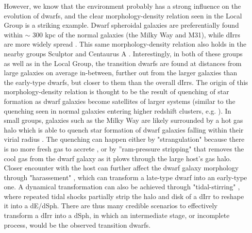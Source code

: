 \documentclass[12pt,preprint]{emulateapj}
\begin{document}
However, we know that the environment probably has a strong influence on the evolution of dwarfs, and the clear morphology-density relation seen in 
the Local Group is a striking example. Dwarf spheroidal galaxies are preferentially found within $\sim$ 300 kpc of the normal galaxies (the Milky Way 
and M31), while dIrrs are more widely spread \citep{vdb94a}. This same morphology-density relation also holds in the nearby groups Sculptor and 
Centaurus A \citep{cds09}. Interestingly, in both of these groups as well as in the Local Group, the transition dwarfs are found at distances from large 
galaxies on average in-between, further out from the larger galaxies than the early-type dwarfs, but closer to them than the overall dIrrs. The origin of 
this morphology-density relation is thought to be the result of quenching of star formation as dwarf galaxies become satellites of larger systems (similar
to the quenching seen in normal galaxies entering higher redshift clusters, e.g. \cite{go03}). In small groups, galaxies such as the Milky Way are likely 
surrounded by a hot gas halo which is able to quench star formation of dwarf galaxies falling within their virial radius \citep{grp09}. The quenching can 
happen either by "strangulation" because there is no more fresh gas to accrete \citep{ltc80}, or by ''ram-pressure stripping" \citep{gg72} that removes 
the cool gas from the dwarf galaxy as it plows through the large host's gas halo. Closer encounter with the host can further affect the dwarf galaxy 
morphology through "harassement" \citep{mkldo96}, which can transform a late-type dwarf into an early-type one. A dynamical transformation can also
be achieved through "tidal-stirring" \citep{mgc01a}, where repeated tidal shocks partially strip the halo and disk of a dIrr to reshape it into a dE/dSph. 
There are thus many credible scenarios to effectively transform a dIrr into a dSph, in which an intermediate stage, or incomplete process, would be the 
observed transition dwarfs.
\end{document}
